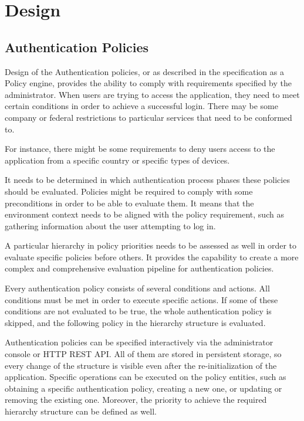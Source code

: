 \chapter{Design}

\section{Authentication Policies}
Design of the Authentication policies, or as described in the specification as a Policy engine, provides the ability to comply with requirements specified by the administrator.
When users are trying to access the application, they need to meet certain conditions in order to achieve a successful login.
There may be some company or federal restrictions to particular services that need to be conformed to.

For instance, there might be some requirements to deny users access to the application from a specific country or specific types of devices.

It needs to be determined in which authentication process phases these policies should be evaluated.
Policies might be required to comply with some preconditions in order to be able to evaluate them.
It means that the environment context needs to be aligned with the policy requirement, such as gathering information about the user attempting to log in.

A particular hierarchy in policy priorities needs to be assessed as well in order to evaluate specific policies before others.
It provides the capability to create a more complex and comprehensive evaluation pipeline for authentication policies.

Every authentication policy consists of several conditions and actions.
All conditions must be met in order to execute specific actions.
If some of these conditions are not evaluated to be true, the whole authentication policy is skipped, and the following policy in the hierarchy structure is evaluated.

Authentication policies can be specified interactively via the administrator console or HTTP REST API.
All of them are stored in persistent storage, so every change of the structure is visible even after the re-initialization of the application. 
Specific operations can be executed on the policy entities, such as obtaining a specific authentication policy, creating a new one, or updating or removing the existing one.
Moreover, the priority to achieve the required hierarchy structure can be defined as well.

